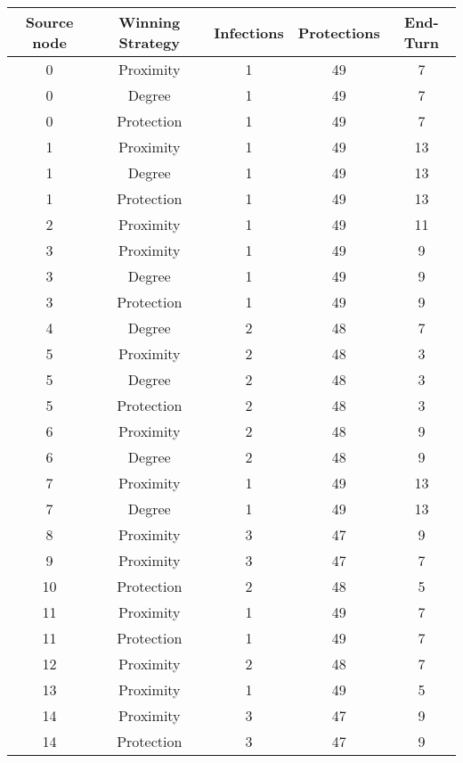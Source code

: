 \documentclass[results.tex]{subfiles}
\begin{document}
\begin{center}
  \begin{tabular}{| c || c | c | c | c |}
    \hline
    {\bfseries Source node} & {\bfseries Winning Strategy} & {\bfseries Infections} & {\bfseries Protections} & {\bfseries End-Turn} \\  %
    \hline\hline
    0 & Proximity & 1 & 49 & 7 \\ 
    \hline
    0 & Degree & 1 & 49 & 7 \\ 
    \hline
    0 & Protection & 1 & 49 & 7 \\ 
    \hline
    1 & Proximity & 1 & 49 & 13 \\ 
    \hline
    1 & Degree & 1 & 49 & 13 \\ 
    \hline
    1 & Protection & 1 & 49 & 13 \\ 
    \hline
    2 & Proximity & 1 & 49 & 11 \\ 
    \hline
    3 & Proximity & 1 & 49 & 9 \\ 
    \hline
    3 & Degree & 1 & 49 & 9 \\ 
    \hline
    3 & Protection & 1 & 49 & 9 \\ 
    \hline
    4 & Degree & 2 & 48 & 7 \\ 
    \hline
    5 & Proximity & 2 & 48 & 3 \\ 
    \hline
    5 & Degree & 2 & 48 & 3 \\ 
    \hline
    5 & Protection & 2 & 48 & 3 \\ 
    \hline
    6 & Proximity & 2 & 48 & 9 \\ 
    \hline
    6 & Degree & 2 & 48 & 9 \\ 
    \hline
    7 & Proximity & 1 & 49 & 13 \\ 
    \hline
    7 & Degree & 1 & 49 & 13 \\ 
    \hline
    8 & Proximity & 3 & 47 & 9 \\ 
    \hline
    9 & Proximity & 3 & 47 & 7 \\ 
    \hline
    10 & Protection & 2 & 48 & 5 \\ 
    \hline
    11 & Proximity & 1 & 49 & 7 \\ 
    \hline
    11 & Protection & 1 & 49 & 7 \\ 
    \hline
    12 & Proximity & 2 & 48 & 7 \\ 
    \hline
    13 & Proximity & 1 & 49 & 5 \\ 
    \hline
    14 & Proximity & 3 & 47 & 9 \\ 
    \hline
    14 & Protection & 3 & 47 & 9 \\ 

\end{tabular}
\end{center}
\end{document}
